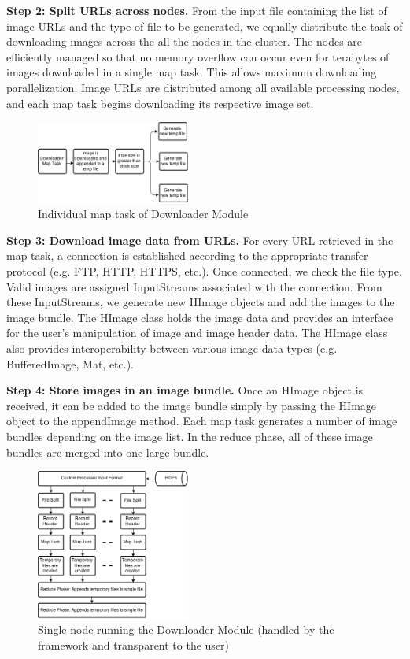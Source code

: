 \documentclass[conference]{IEEEtran}
\begin{document}
\textbf{Step 2: Split URLs across nodes.}  From the input file
containing the list of image URLs and the type of file to be
generated, we equally distribute the task of downloading images across
the all the nodes in the cluster. The nodes are efficiently managed so
that no memory overflow can occur even for terabytes of images
downloaded in a single map task. This allows maximum downloading
parallelization. Image URLs are distributed among all available
processing nodes, and each map task begins downloading its respective
image set.

\begin{figure}[h]
	\centering
	\includegraphics[width=0.45\textwidth]{down-map}
	\caption{Individual map task of Downloader Module}
	\label{fig:down-map}
\end{figure}

\textbf{Step 3: Download image data from URLs.}  For every URL
retrieved in the map task, a connection is established according to
the appropriate transfer protocol (e.g. FTP, HTTP, HTTPS, etc.). Once
connected, we check the file type.  Valid images are assigned
InputStreams associated with the connection. From these InputStreams,
we generate new HImage objects and add the images to the image
bundle. The HImage class holds the image data and provides an
interface for the user's manipulation of image and image header
data. The HImage class also provides interoperability between various
image data types (e.g. BufferedImage, Mat, etc.).

\textbf{ Step 4: Store images in an image bundle. }  Once an HImage
object is received, it can be added to the image bundle simply by
passing the HImage object to the appendImage method. Each map task
generates a number of image bundles depending on the image list. In
the reduce phase, all of these image bundles are merged into one large
bundle.

\begin{figure}[h]
	\centering
	\includegraphics[width=0.45\textwidth]{down-node}
	\caption{Single node running the Downloader Module (handled by
          the framework and transparent to the user)}
	\label{fig:down-node}
\end{figure}
\end{document}
